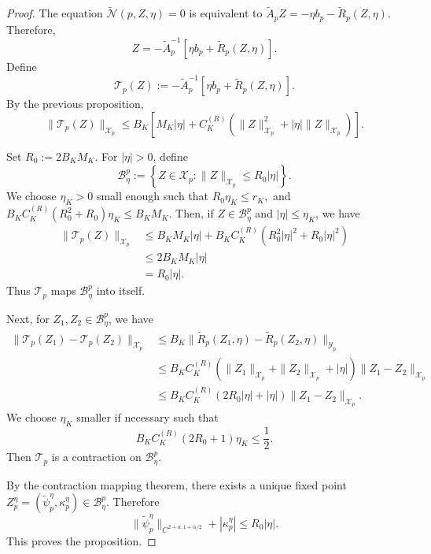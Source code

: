 \documentclass[preprint]{elsarticle}
\numberwithin{equation}{section}
\begin{document}
\begin{proof}
The equation
$
\widetilde{\mathcal N}(p,Z,\eta)=0
$
is equivalent to $\widetilde A_pZ
=
-\eta b_p-\widetilde R_p(Z,\eta).$
Therefore,
\begin{equation*}
Z
=
-\widetilde A_p^{-1}
\left[
\eta b_p+\widetilde R_p(Z,\eta)
\right].
\end{equation*}
Define
\begin{equation*}
\mathcal T_p(Z)
:=
-\widetilde A_p^{-1}
\left[
\eta b_p+\widetilde R_p(Z,\eta)
\right].
\end{equation*}
By the previous proposition,
\begin{equation*}
\|\mathcal T_p(Z)\|_{\mathcal X_p}
\le
B_K
\left[
M_K|\eta|
+
C_K^{(R)}
\left(
\|Z\|_{\mathcal X_p}^2
+
|\eta|\|Z\|_{\mathcal X_p}
\right)
\right].
\end{equation*}

Set
$
R_0:=2B_KM_K.
$
For $|\eta|>0$, define
\begin{equation*}
\mathcal B_\eta^p
:=
\left\{
Z\in\mathcal X_p:
\|Z\|_{\mathcal X_p}\le R_0|\eta|
\right\}.
\end{equation*}
We choose $\eta_K>0$ small enough such that $R_0\eta_K\le r_K,$
and $B_KC_K^{(R)}(R_0^2+R_0)\eta_K
\le
B_KM_K.$
Then, if $Z\in\mathcal B_\eta^p$ and $|\eta|\le\eta_K$, we have
\begin{equation*}
\begin{aligned}
\|\mathcal T_p(Z)\|_{\mathcal X_p}
&\le
B_KM_K|\eta|
+
B_KC_K^{(R)}
\left(
R_0^2|\eta|^2
+
R_0|\eta|^2
\right)
\\
&\le
2B_KM_K|\eta|
\\
&=
R_0|\eta|.
\end{aligned}
\end{equation*}
Thus $\mathcal T_p$ maps $\mathcal B_\eta^p$ into itself.

Next, for $Z_1,Z_2\in\mathcal B_\eta^p$, we have
\begin{equation*}
\begin{aligned}
\|\mathcal T_p(Z_1)-\mathcal T_p(Z_2)\|_{\mathcal X_p}
&\le
B_K
\|\widetilde R_p(Z_1,\eta)-\widetilde R_p(Z_2,\eta)\|_{\mathcal Y_p}
\\
&\le
B_KC_K^{(R)}
\left(
\|Z_1\|_{\mathcal X_p}
+
\|Z_2\|_{\mathcal X_p}
+
|\eta|
\right)
\|Z_1-Z_2\|_{\mathcal X_p}
\\
&\le
B_KC_K^{(R)}
(2R_0|\eta|+|\eta|)
\|Z_1-Z_2\|_{\mathcal X_p}.
\end{aligned}
\end{equation*}
We choose $\eta_K$ smaller if necessary such that
\begin{equation*}
B_KC_K^{(R)}(2R_0+1)\eta_K\le\frac12.
\end{equation*}
Then $\mathcal T_p$ is a contraction on $\mathcal B_\eta^p$.

By the contraction mapping theorem, there exists a unique fixed point
$
Z_p^\eta=(\widetilde\psi_p^\eta,\kappa_p^\eta)\in\mathcal B_\eta^p.
$
Therefore
\begin{equation*}
\|\widetilde\psi_p^\eta\|_{C^{2+\alpha,1+\alpha/2}}
+
|\kappa_p^\eta|
\le
R_0|\eta|.
\end{equation*}
This proves the proposition.
\end{proof}
\end{document}
